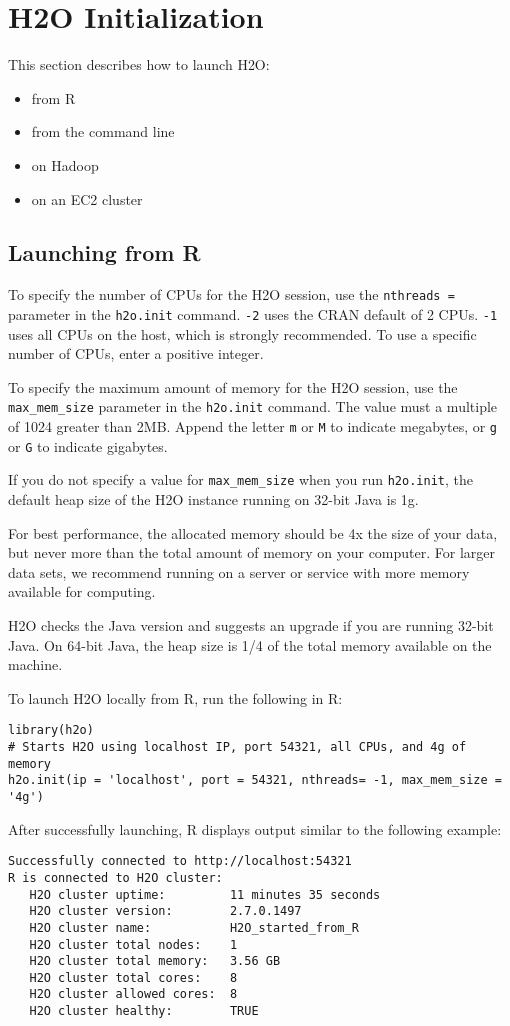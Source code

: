{{\newpage
\section{H2O Initialization}

This section describes how to launch H2O: 
\begin{itemize}
\item from R
\item from the command line
\item on Hadoop
\item on an EC2 cluster
\end{itemize}

\subsection{Launching from R} \label{ssec:LaunchR}

To specify the number of CPUs for the H2O session, use the \texttt{nthreads = } parameter in the \texttt{h2o.init} command. \texttt{-2} uses the CRAN default of 2 CPUs. \texttt{-1} uses 
all CPUs on the host, which is strongly recommended. To use a specific number of CPUs, enter a positive integer.

To specify the maximum amount of memory for the H2O session, use the {\texttt{max\_mem\_size}} parameter in the \texttt{h2o.init} command. The value must a multiple of 1024 greater than 2MB. Append the letter \texttt{m} or \texttt{M} to indicate megabytes, or \texttt{g} or \texttt{G} to indicate gigabytes. 

If you do not specify a value for {\texttt{max\_mem\_size}} when you run {\texttt{h2o.init}}, the default heap size of the H2O instance running on 32-bit Java is 1g. 

For best performance, the allocated memory should be 4x the size of your data, but never more than the total amount of memory on your computer. For larger data sets, we recommend running on a server or service with more memory available for computing.

H2O checks the Java version and suggests an upgrade if you are running 32-bit Java. On 64-bit Java, the heap size is 1/4 of the total memory available on the machine. 

To launch H2O locally from R, run the following in R:
\begin{lstlisting}[style=R]
library(h2o)
# Starts H2O using localhost IP, port 54321, all CPUs, and 4g of memory  
h2o.init(ip = 'localhost', port = 54321, nthreads= -1, max_mem_size = '4g')
\end{lstlisting}
\newpage
After successfully launching, R displays output similar to the following example: 
\begin{lstlisting}[style=R]
Successfully connected to http://localhost:54321
R is connected to H2O cluster:
   H2O cluster uptime:         11 minutes 35 seconds
   H2O cluster version:        2.7.0.1497 
   H2O cluster name:           H2O_started_from_R
   H2O cluster total nodes:    1
   H2O cluster total memory:   3.56 GB
   H2O cluster total cores:    8
   H2O cluster allowed cores:  8
   H2O cluster healthy:        TRUE
\end{lstlisting}

}}
